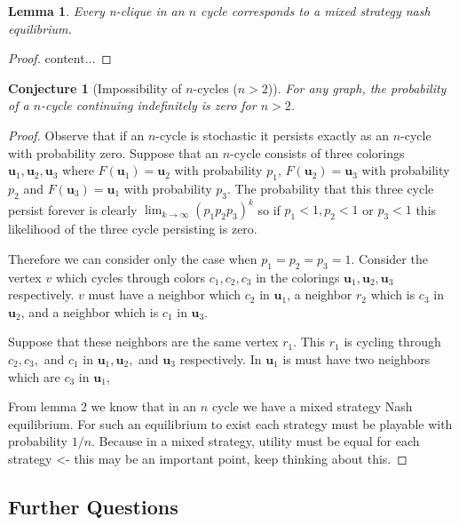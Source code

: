 \documentclass[]{article}
\newtheorem{conjecture}[theorem]{Conjecture}
\newtheorem{lemma}[theorem]{Lemma}
\newcommand{\uu}{\mathbf{u}}
\begin{document}
\begin{lemma}
	Every n-clique in an $n$ cycle corresponds to a mixed strategy nash equilibrium. 
\end{lemma}

\begin{proof}
	content...
\end{proof}

\begin{conjecture}[Impossibility of $n$-cycles ($n>2$)]
	For any graph, the probability of a $n$-cycle continuing indefinitely is zero for $n>2$.
\end{conjecture}

\begin{proof}
	Observe that if an $n$-cycle is stochastic it persists exactly as an $n$-cycle with probability zero. Suppose that an $n$-cycle consists of three colorings $\uu_1,\uu_2,\uu_3$ where $F(\uu_1)=\uu_2$ with probability $p_1$, $F(\uu_2)=\uu_3$ with probability $p_2$ and $F(\uu_3)=\uu_1$ with probability $p_3$. The probability that this three cycle persist forever is clearly $\lim_{k\rightarrow \infty} (p_1p_2p_3)^k$ so if $p_1<1, p_2<1$ or $p_3<1$ this likelihood of the three cycle persisting is zero. 
	
	Therefore we can consider only the case when $p_1=p_2=p_3=1$. Consider the vertex $v$ which cycles through colors $c_1, c_2, c_3$ in the colorings $\uu_1,\uu_2, \uu_3$ respectively. $v$ must have a neighbor which $c_2$ in $\uu_1$, a neighbor $r_2$ which is $c_3$ in $\uu_2$, and a neighbor which is $c_1$ in $\uu_3$. 
	
	 Suppose that these neighbors are the same vertex $r_1$. This $r_1$ is cycling through $c_2,c_3,$ and $c_1$ in $\uu_1,\uu_2,$ and $\uu_3$ respectively. In $\uu_1$ is must have two neighbors which are $c_3$ in $\uu_1$, 

	
	From lemma 2 we know that in an $n$ cycle we have a mixed strategy Nash equilibrium. For such an equilibrium to exist each strategy must be playable with probability $1/n$. Because in a mixed strategy, utility must be equal for each strategy  <- this may be an important point, keep thinking about this. 
\end{proof}



\subsection{Further Questions}
\end{document}
